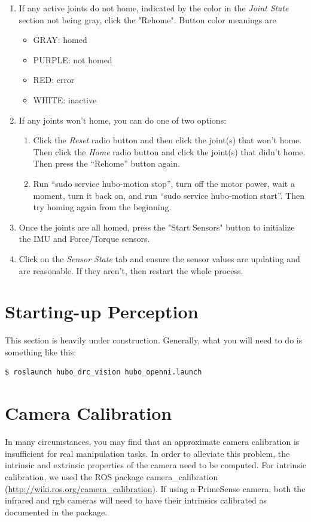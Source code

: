 \documentclass[letterpaper, 10 pt]{report}
\begin{document}
\begin{enumerate}
  \item If any active joints do not home, indicated by the color in the \textit{Joint State} section not being gray, click the "Rehome". Button color meanings are
    \begin{itemize}
      \item GRAY: homed
      \item PURPLE: not homed
      \item RED: error
      \item WHITE: inactive
    \end{itemize}
  \item If any joints won't home, you can do one of two options:
    \begin{enumerate}
      \item Click the \textit{Reset} radio button and then click the joint(s) that won't home. Then click the \textit{Home} radio button and click the joint(s) that didn't home. Then press the ``Rehome'' button again.
      \item Run ``sudo service hubo-motion stop'', turn off the motor power, wait a moment, turn it back on, and run ``sudo service hubo-motion start''. Then try homing again from the beginning.
    \end{enumerate}
  \item Once the joints are all homed, press the "Start Sensors" button to initialize the IMU and Force/Torque sensors.
  \item Click on the \textit{Sensor State} tab and ensure the sensor values are updating and are reasonable. If they aren't, then restart the whole process.
\end{enumerate}

\section{Starting-up Perception} \label{sec:starting-up-perception}
This section is heavily under construction. Generally, what you will need to do is something like this:
  \begin{lstlisting}[language=bash]
    $ roslaunch hubo_drc_vision hubo_openni.launch
  \end{lstlisting}
  
\pagebreak
\section{Camera Calibration} \label{sec:calibration}
In many circumstances, you may find that an approximate camera calibration is insufficient for real manipulation tasks.
In order to alleviate this problem, the intrinsic and extrinsic properties of the camera need to be computed.
For intrinsic calibration, we used the ROS package camera\_calibration (\url{http://wiki.ros.org/camera_calibration}). If using a PrimeSense camera, both the infrared and rgb cameras will need to have their intrinsics calibrated as documented in the package.
\end{document}
